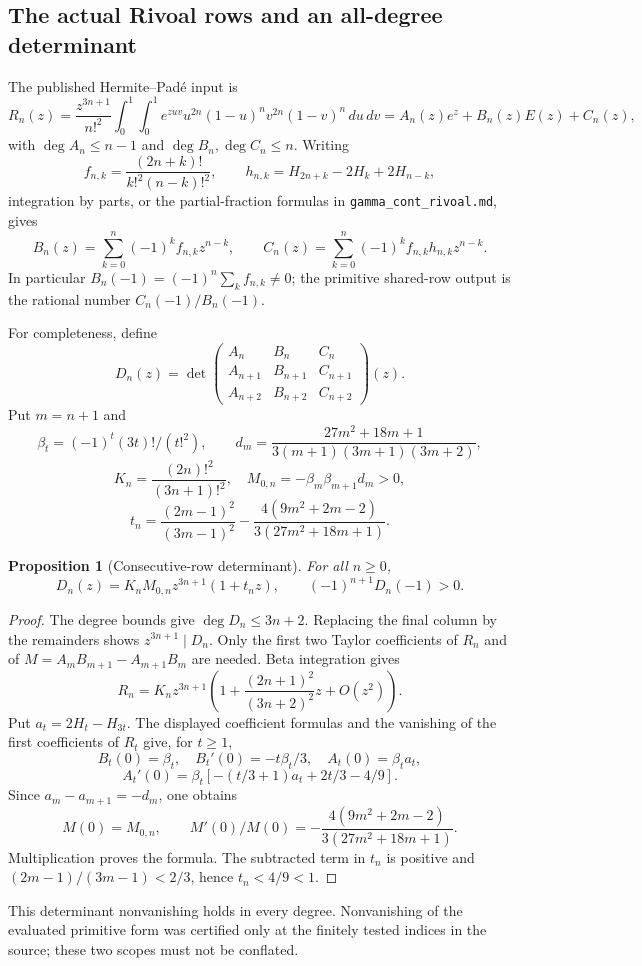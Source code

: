 \documentclass[11pt,a4paper]{article}
\newtheorem{proposition}[theorem]{Proposition}
\theoremstyle{definition}
\theoremstyle{remark}
\numberwithin{equation}{section}
\begin{document}
\subsection{The actual Rivoal rows and an all-degree determinant}
\label{ec:rivoal}
The published Hermite--Pad\'e input is
\[
 R_n(z)=\frac{z^{3n+1}}{n!^2}
 \int_0^1\!\int_0^1e^{zuv}u^{2n}(1-u)^n v^{2n}(1-v)^n\,du\,dv
 =A_n(z)e^z+B_n(z)E(z)+C_n(z),
\]
with $\deg A_n\le n-1$ and $\deg B_n,\deg C_n\le n$.
Writing
\[
 f_{n,k}=\frac{(2n+k)!}{k!^2(n-k)!^2},\qquad
 h_{n,k}=H_{2n+k}-2H_k+2H_{n-k},
\]
integration by parts, or the partial-fraction formulas in
\texttt{gamma\_cont\_rivoal.md}, gives
\[
 B_n(z)=\sum_{k=0}^n(-1)^kf_{n,k}z^{n-k},\qquad
 C_n(z)=\sum_{k=0}^n(-1)^kf_{n,k}h_{n,k}z^{n-k}.
\]
In particular $B_n(-1)=(-1)^n\sum_k f_{n,k}\ne0$; the primitive
shared-row output is the rational number $C_n(-1)/B_n(-1)$.

For completeness, define
\[
 D_n(z)=\det\begin{pmatrix}
 A_n&B_n&C_n\\A_{n+1}&B_{n+1}&C_{n+1}\\A_{n+2}&B_{n+2}&C_{n+2}
 \end{pmatrix}(z).
\]
Put $m=n+1$ and
\[
 \beta_t=(-1)^t(3t)!/(t!^2),\qquad
 d_m=\frac{27m^2+18m+1}{3(m+1)(3m+1)(3m+2)},
\]
\[
 K_n=\frac{(2n)!^2}{(3n+1)!^2},\quad
 M_{0,n}=-\beta_m\beta_{m+1}d_m>0,
\]
\[
 t_n=\frac{(2m-1)^2}{(3m-1)^2}
      -\frac{4(9m^2+2m-2)}{3(27m^2+18m+1)}.
\]

\begin{proposition}[Consecutive-row determinant]
\label{ec:rivoal-det}
For all $n\ge0$,
\[
 D_n(z)=K_nM_{0,n}z^{3n+1}(1+t_nz),\qquad
 (-1)^{n+1}D_n(-1)>0.
\]
\end{proposition}
\begin{proof}
The degree bounds give $\deg D_n\le3n+2$.  Replacing the final column
by the remainders shows $z^{3n+1}\mid D_n$.  Only the first two
Taylor coefficients of $R_n$ and of
$M=A_mB_{m+1}-A_{m+1}B_m$ are needed.  Beta integration gives
\[
 R_n=K_nz^{3n+1}
 \left(1+\frac{(2n+1)^2}{(3n+2)^2}z+O(z^2)\right).
\]
Put $a_t=2H_t-H_{3t}$.  The displayed coefficient formulas and the
vanishing of the first coefficients of $R_t$ give, for $t\ge1$,
\[
 B_t(0)=\beta_t,\quad B_t'(0)=-t\beta_t/3,
 \quad A_t(0)=\beta_ta_t,
\]
\[
 A_t'(0)=\beta_t\left[-(t/3+1)a_t+2t/3-4/9\right].
\]
Since $a_m-a_{m+1}=-d_m$, one obtains
\[
 M(0)=M_{0,n},\qquad
 M'(0)/M(0)=-\frac{4(9m^2+2m-2)}{3(27m^2+18m+1)}.
\]
Multiplication proves the formula.  The subtracted term in $t_n$ is
positive and $(2m-1)/(3m-1)<2/3$, hence $t_n<4/9<1$.
\end{proof}
This determinant nonvanishing holds in every degree.  Nonvanishing of the
evaluated primitive form was certified only at the finitely tested indices
in the source; these two scopes must not be conflated.
\end{document}
